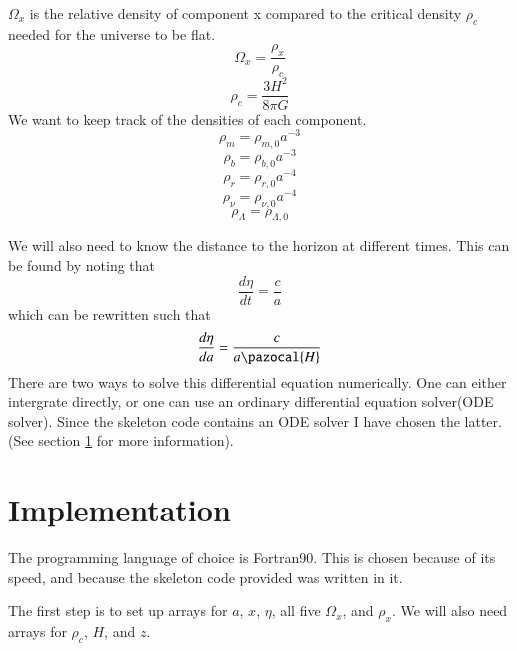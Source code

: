 \documentclass{aa}   %
\begin{document}
$\Omega_x$ is the relative density of component x compared to the critical density $\rho_c$ needed for the universe to be flat.
\begin{equation}
 \Omega_x = \frac{\rho_x}{\rho_c}
\end{equation}
\begin{equation}
 \rho_c = \frac{3H^2}{8\pi G}
\end{equation}
We want to keep track of the densities of each component.
\begin{equation}
 \rho_m = \rho_{m,0}a^{-3}
\end{equation}
\begin{equation}
 \rho_b = \rho_{b,0}a^{-3}
\end{equation}
\begin{equation}
 \rho_r = \rho_{r,0}a^{-4}
\end{equation}
\begin{equation}
 \rho_\nu = \rho_{\nu,0}a^{-4}
\end{equation}
\begin{equation}
 \rho_\Lambda = \rho_{\Lambda,0}
\end{equation}

We will also need to know the distance to the horizon at different times. This can be found by noting that
\begin{equation*}
 \frac{d\eta}{dt} = \frac{c}{a}
\end{equation*}
which can be rewritten such that
\begin{equation}\label{eta}
 \frac{d\eta}{da} = \frac{c}{a \pazocal{H}}
\end{equation}
There are two ways to solve this differential equation numerically. One can either intergrate directly, or one can use an ordinary differential equation solver(ODE solver). Since the skeleton code contains an ODE solver I have chosen the latter. (See section \ref{sec:Imp} for more information).

\section{Implementation}\label{sec:Imp}
The programming language of choice is Fortran90. This is chosen because of its speed, and because the skeleton code provided was written in it. 

The first step is to set up arrays for $a$, $x$, $\eta$, all five $\Omega_x$, and $\rho_x$. We will also need arrays for $\rho_c$, $H$, and $z$.
\end{document}
